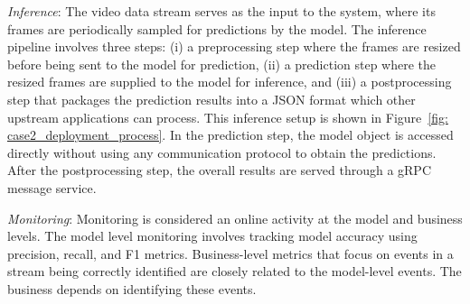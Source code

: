 \textit{Inference}: The video data stream serves as the input to the system, where its frames are periodically sampled for predictions by the model. The inference pipeline involves three steps: (i) a preprocessing step where the frames are resized before being sent to the model for prediction, (ii) a prediction step where the resized frames are supplied to the model for inference, and (iii) a postprocessing step that packages the prediction results into a JSON format which other upstream applications can process. This inference setup is shown in Figure~\ref{fig: case2_deployment_process}. In the prediction step, the model object is accessed directly without using any communication protocol to obtain the predictions. After the postprocessing step, the overall results are served through a gRPC message service.

\textit{Monitoring}:
Monitoring is considered an online activity at the model and business levels. The model level monitoring involves tracking model accuracy using precision, recall, and F1 metrics. Business-level metrics that focus on events in a stream being correctly identified are closely related to the model-level events. The business depends on identifying these events. %

